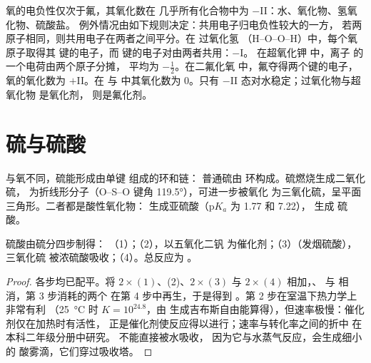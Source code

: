 \begin{example}[氧的氧化数]
氧的电负性仅次于氟，其氧化数在
几乎所有化合物中为 $-$II：水、氧化物、氢氧化物、硫酸盐。
例外情况由如下规则决定：共用电子归电负性较大的一方，
若两原子相同，则共用电子在两者之间平分。在
过氧化氢 （H--O--O--H）中，每个氧原子取得其
 键的电子，而  键的电子对由两者共用：$-$I。
在超氧化钾  中，离子  的一个电荷由两个原子分摊，
平均为 $-\frac12$。在二氟化氧  中，氟夺得两个键的电子，
氧的氧化数为 $+$II。在  与  中其氧化数为 0。只有
$-$II 态对水稳定；过氧化物与超氧化物
是氧化剂， 则是氟化剂。
\end{example}

\section{硫与硫酸}

与氧不同，硫能形成由单键  组成的环和链：
普通硫由  环构成。硫燃烧生成二氧化硫，
为折线形分子（O--S--O 键角 \ang{119.5}），可进一步被氧化
为三氧化硫，呈平面三角形。二者都是酸性氧化物：
生成亚硫酸（$\mathrm{p}K_a$ 为 1.77 和 7.22）， 生成
硫酸。

\begin{proposition}[接触法的步骤]\label{prop:b1:p-block-16-18:contact-steps}
硫酸由硫分四步制得：
（1）；（2），以五氧化二钒
为催化剂；（3）（发烟硫酸），三氧化硫
被浓硫酸吸收；（4）。总反应为
。
\end{proposition}

\begin{proof}
各步均已配平。将 $2\times(1)$、(2)、$2\times(3)$ 与
$2\times(4)$ 相加，、 与  相消，第 3 步消耗的两个
 在第 4 步中再生，于是得到
。第 2 步在室温下热力学上非常有利
（\qty{25}{\celsius} 时 $K = 10^{24.8}$，由
生成吉布斯自由能算得），但速率极慢：催化剂仅在加热时有活性，
正是催化剂使反应得以进行；速率与转化率之间的折中
在本科二年级分册中研究。 不能直接被水吸收，
因为它与水蒸气反应，会生成细小的
酸雾滴，它们穿过吸收塔。
\end{proof}

